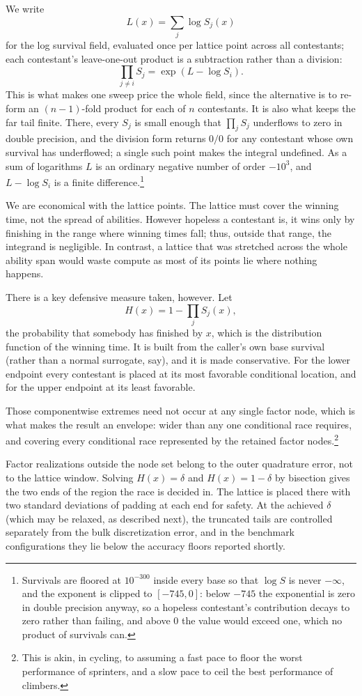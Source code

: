 \documentclass[11pt]{article}
\begin{document}
We write $$L(x)=\sum_j \log S_j(x)$$ for
the log survival field, evaluated once per lattice point across all
contestants; each contestant's leave-one-out product is a subtraction
rather than a division: $$\prod_{j\neq i}S_j = \exp(L-\log S_i).$$ This is
what makes one sweep price the whole field, since the alternative is to
re-form an $(n-1)$-fold product for each of $n$ contestants. It is also
what keeps the far tail finite. There, every $S_j$ is small enough that
$\prod_j S_j$ underflows to zero in double precision, and the division
form returns $0/0$ for any contestant whose own survival has underflowed;
a single such point makes the integral undefined. As a sum of logarithms
$L$ is an ordinary negative number of order $-10^{3}$, and $L-\log S_i$
is a finite difference.\footnote{Survivals are floored at $10^{-300}$ inside every
base so that $\log S$ is never $-\infty$, and the exponent is clipped to
$[-745,0]$: below $-745$ the exponential is zero in double precision
anyway, so a hopeless contestant's contribution decays to zero rather
than failing, and above $0$ the value would exceed one, which no product
of survivals can.}

We are economical with the lattice points. The lattice must cover the winning time, not the spread of abilities. However
hopeless a contestant is, it wins only by finishing in the range where
winning times fall; thus, outside that range, the integrand is negligible. In contrast, a lattice that was stretched across the whole ability span would waste compute as most of its points lie where nothing happens.

There is a key defensive measure taken, however. Let $$H(x)=1-\prod_j S_j(x),$$ the probability that somebody has finished
by $x$, which is the distribution function of the winning time. It is
built from the caller's own base survival (rather than a normal
surrogate, say), and it is made conservative. For
the lower endpoint every contestant is placed at its most favorable conditional location, and for the upper endpoint at its least favorable.

Those componentwise extremes need not occur at any single factor node, which is what makes the result an envelope: wider than any one conditional race requires, and covering every conditional race represented by the retained factor nodes.\footnote{This is akin, in cycling, to assuming a fast pace to floor the worst performance of sprinters, and a slow pace to ceil the best performance of climbers.}

Factor realizations outside the node set belong to the outer quadrature error, not to the lattice
window. Solving $H(x)=\delta$ and
$H(x)=1-\delta$ by bisection gives the two ends of the region the race
is decided in. The lattice is placed there with two standard deviations of padding at
each end for safety. At the achieved $\delta$ (which may be relaxed, as
described next), the truncated tails are controlled separately from the
bulk discretization error, and in the benchmark configurations they lie
below the accuracy floors reported shortly.
\end{document}
